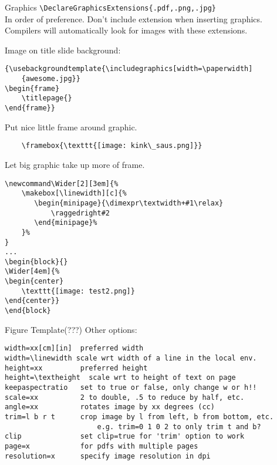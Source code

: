 \documentclass[9pt]{beamer}
\newcommand\Wider[2][3em]{%
    \makebox[\linewidth][c]{%
       \begin{minipage}{\dimexpr\textwidth+#1\relax}
           \raggedright#2
       \end{minipage}%
    }%
}
\begin{document}
\begin{frame}[fragile=singleslide]{Graphics}
    \verb|\DeclareGraphicsExtensions{.pdf,.png,.jpg}|\\
    In order of preference. Don't include extension when inserting
    graphics. Compilers will automatically look for images with these
    extensions.

    Image on title slide background:
    \begin{verbatim}
{\usebackgroundtemplate{\includegraphics[width=\paperwidth]
    {awesome.jpg}}
\begin{frame}
    \titlepage{}
\end{frame}}
    \end{verbatim}
    Put nice little frame around graphic.
    \begin{verbatim}
    \framebox{\texttt{[image: kink\_saus.png]}}
    \end{verbatim}
\end{frame}

\begin{frame}[fragile=singleslide]{}
    Let big graphic take up more of frame.
    \begin{verbatim}
\newcommand\Wider[2][3em]{%
    \makebox[\linewidth][c]{%
       \begin{minipage}{\dimexpr\textwidth+#1\relax}
           \raggedright#2
       \end{minipage}%
    }%
}
...
\begin{block}{}
\Wider[4em]{%
\begin{center}
    \texttt{[image: test2.png]}
\end{center}}
\end{block}
    \end{verbatim}
\end{frame}

\begin{frame}[fragile=singleslide]{Figure Template(???)}
Other options:
    \begin{verbatim}
width=xx[cm][in]  preferred width
width=\linewidth scale wrt width of a line in the local env.
height=xx         preferred height
height=\textheight  scale wrt to height of text on page
keepaspectratio   set to true or false, only change w or h!!
scale=xx          2 to double, .5 to reduce by half, etc.
angle=xx          rotates image by xx degrees (cc)
trim=l b r t      crop image by l from left, b from bottom, etc.
                      e.g. trim=0 1 0 2 to only trim t and b?
clip              set clip=true for 'trim' option to work
page=x            for pdfs with multiple pages
resolution=x      specify image resolution in dpi
    \end{verbatim}
\end{frame}
\end{document}
